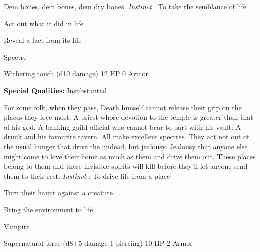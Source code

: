 
       
\startMonsterDescription
Dem bones, dem bones, dem dry bones. {\em Instinct} : To take the semblance of life
\stopMonsterDescription
       
\startitemize[1,packed]
         
\item Act out what it did in life

         
\item Reveal a fact from its life

       
\stopitemize
       
\startMonsterName
Spectre	 
\stopMonsterName
       

Withering touch (d10 damage)	12 HP	0 Armor

       


       
\startMonsterQualities
         {\bf Special Qualities:}  Insubstantial
\stopMonsterQualities
       
\startMonsterDescription
For some folk, when they pass, Death himself cannot release their grip on the places they love most.  A priest whose devotion to the temple is greater than that of his god.  A banking guild official who cannot bear to part with his vault.  A drunk and his favourite tavern.  All make excellent spectres.  They act not out of the usual hunger that drive the undead, but jealousy.  Jealousy that anyone else might come to love their home as much as them and drive them out.  These places belong to them and these invisible spirits will kill before they’ll let anyone send them to their rest. {\em Instinct} : To drive life from a place
\stopMonsterDescription
       
\startitemize[1,packed]
         
\item Turn their haunt against a creature

         
\item Bring the environment to life

       
\stopitemize
       
\startMonsterName
Vampire	 
\stopMonsterName
       

Supernatural force (d8+5 damage 1 piercing)	10 HP	2 Armor

       


